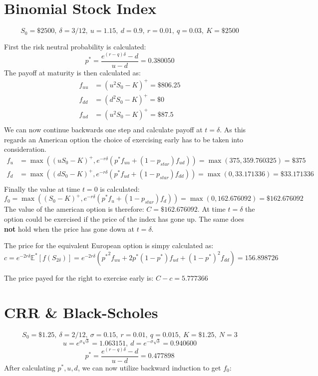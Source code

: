 \documentclass{article}
\begin{document}
\section{Binomial Stock Index}
$$S_0 = \$2500, \ \delta=3/12, \ u=1.15, \ d=0.9, \ r=0.01, \ q=0.03, \ K=\$2500$$

First the risk neutral probability is calculated:
$$p^* = \frac{e^{(r-q) \delta} - d}{u - d} = 0.380050$$
The payoff at maturity is then calculated as:
\begin{align*}
	f_{uu} &= (u^2S_0 - K)^+ = \$806.25 \\
	f_{dd} &= (d^2S_0 - K)^+ = \$0 \\
	f_{ud} &= (u^2S_0 - K)^+ = \$87.5\\
\end{align*}
We can now continue backwards one step and calculate payoff at $t=\delta$. As this regards an American option the choice of exercising early has to be taken into consideration.
\begin{align*}
	f_u &= \max\left( (uS_0 -K)^+, e^{-r\delta}(p^*f_{uu} + (1-p_{star})f_{ud}) \right) = \max(375, 359.760325) = \$375 \\
	f_d &= \max\left( (dS_0 -K)^+, e^{-r\delta}(p^*f_{ud} + (1-p_{star})f_{dd}) \right) = \max(0, 33.171336) = \$33.171336\\
\end{align*}
Finally the value at time $t=0$ is calculated:
$$f_0 = \max\left( (S_0 -K)^+, e^{-r\delta}(p^*f_{u} + (1-p_{star})f_{d}) \right) = \max(0, 162.676092) = \$162.676092$$
The value of the american option is therefore: $C = \$162.676092$. At time $t=\delta$ the option could be exercised if the price of the index has gone up. The same does \textbf{not} hold when the price has gone down at $t=\delta$. 

The price for the equivalent European option is simpy calculated as:
$$c = e^{-2r\delta}\mathbb{E}^*\left[f(S_{2\delta})\right] = e^{-2r\delta}\left({p^*}^2f_{uu} + 2p^*(1-p^*)f_{ud} + (1-p^*)^2f_{dd}\right) = 156.898726$$

The price payed for the right to exercise early is: $C-c = 5.777366$

\section{CRR \& Black-Scholes}
$$S_0 = \$1.25, \ \delta=2/12, \ \sigma=0.15, \ r=0.01, \ q=0.015, \ K=\$1.25, \ N = 3$$
$$u = e^{\sigma\sqrt{\delta}} = 1.063151, \ d = e^{-\sigma\sqrt{\delta}} = 0.940600$$
$$p^* = \frac{e^{(r-q)\delta}-d}{u-d} = 0.477898$$
After calculating $p^*, u, d$, we can now utilize backward induction to get $f_0$:
\end{document}

